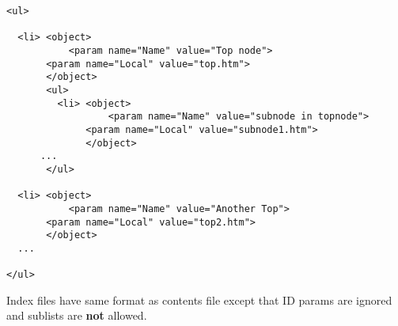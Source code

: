 \begin{verbatim}
<ul>

  <li> <object>
           <param name="Name" value="Top node">
	   <param name="Local" value="top.htm">
       </object>
       <ul>
         <li> <object>
                  <param name="Name" value="subnode in topnode">
	          <param name="Local" value="subnode1.htm">
              </object>
	  ...
       </ul>
       
  <li> <object>
           <param name="Name" value="Another Top">
	   <param name="Local" value="top2.htm">
       </object>
  ...    

</ul>
\end{verbatim}



Index files have same format as contents file except that ID params are ignored and sublists are {\bf not} 
allowed.


